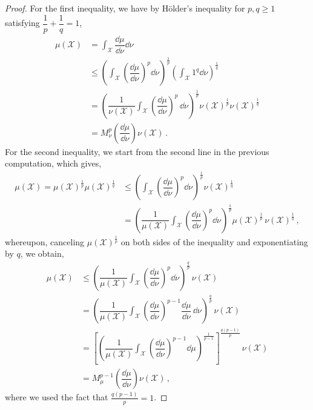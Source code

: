 \documentclass[reqno]{amsart}
\begin{document}
\begin{proof}
For the first inequality, we have by Hölder's inequality for $p,q \geq 1$ satisfying $\dfrac{1}{p} + \dfrac{1}{q} = 1$,
\begin{align*}
\mu(\mathcal{X}) &= \int_\mathcal{X} \dfrac{\dd \mu}{\dd \nu} \dd \nu \\
&\leq   \left(  \int_\mathcal{X}  \left(  \dfrac{\dd \mu}{\dd \nu} \right)^p \dd \nu \right)^{\frac{1}{p}} \left( \int_\mathcal{X} 1^q \dd \nu  \right)^{\frac{1}{q}}      \\
&= \left(   \dfrac{1}{\nu(\mathcal{X})} \int_\mathcal{X}   \left(  \dfrac{\dd \mu}{\dd \nu} \right)^p  \, \dd \nu \right)^{\frac{1}{p}}      \nu(\mathcal{X})^{\frac{1}{p}}     \nu(\mathcal{X}) ^{\frac{1}{q}}  \\
&= M^p_\nu \left( \dfrac{\dd \mu}{\dd \nu}  \right) \nu(\mathcal{X}) \, .
\end{align*}
For the second inequality, we start from the second line in the previous computation, which gives, \begin{align*}
\mu(\mathcal{X}) =\mu(\mathcal{X})^{\frac{1}{p}} \mu(\mathcal{X})^{\frac{1}{q}}
&\leq   \left(  \int_\mathcal{X}  \left(  \dfrac{\dd \mu}{\dd \nu} \right)^p \dd \nu \right)^{\frac{1}{p}} \nu(\mathcal{X})^{\frac{1}{q}}      \\
&= \left(  \dfrac{1}{\mu(\mathcal{X})} \int_\mathcal{X}  \left(  \dfrac{\dd \mu}{\dd \nu} \right)^p \dd \nu \right)^{\frac{1}{p}} \mu(\mathcal{X})^{\frac{1}{p}} \, \nu(\mathcal{X})^{\frac{1}{q}}   \, ,
\end{align*}
whereupon, canceling $\mu(\mathcal{X})^{\frac{1}{p}}$ on both sides of the inequality and exponentiating by $q$, we obtain,
\begin{align*}
\mu(\mathcal{X}) 
&\leq   \left(  \dfrac{1}{\mu(\mathcal{X})} \int_\mathcal{X}  \left(  \dfrac{\dd \mu}{\dd \nu} \right)^p \dd \nu \right)^{\frac{q}{p}} \, \nu(\mathcal{X})    \\
&=    \left(  \dfrac{1}{\mu(\mathcal{X})} \int_\mathcal{X}  \left(  \dfrac{\dd \mu}{\dd \nu} \right)^{p-1}  \dfrac{\dd \mu}{\dd \nu} \, \dd \nu \right)^{\frac{q}{p}} \, \nu(\mathcal{X})    \\
&=   \left[ \left(  \dfrac{1}{\mu(\mathcal{X})} \int_\mathcal{X}  \left(  \dfrac{\dd \mu}{\dd \nu} \right)^{p-1}     \dd \mu \right)^{\frac{1}{p-1}} \right]^{\frac{q(p-1)}{p}} \, \nu(\mathcal{X})    \\
&= M^{p-1}_\mu \left( \dfrac{\dd \mu}{\dd \nu}  \right) \nu(\mathcal{X}) \, ,
\end{align*}
where we used the fact that $\frac{q(p-1)}{p} = 1$.
\end{proof}
\end{document}
